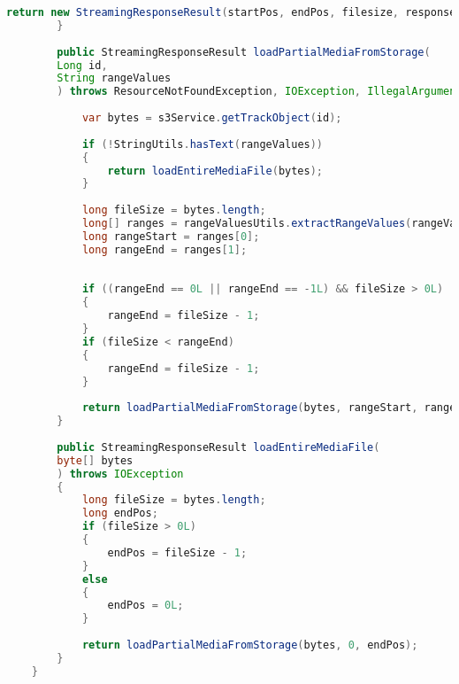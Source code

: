 \begin{lstlisting}[language=java]
			return new StreamingResponseResult(startPos, endPos, filesize, responseStream);
		}
		
		public StreamingResponseResult loadPartialMediaFromStorage(
		Long id,
		String rangeValues
		) throws ResourceNotFoundException, IOException, IllegalArgumentException {
			
			var bytes = s3Service.getTrackObject(id);
			
			if (!StringUtils.hasText(rangeValues))
			{
				return loadEntireMediaFile(bytes);
			}
			
			long fileSize = bytes.length;
			long[] ranges = rangeValuesUtils.extractRangeValues(rangeValues);
			long rangeStart = ranges[0];
			long rangeEnd = ranges[1];
			
			
			if ((rangeEnd == 0L || rangeEnd == -1L) && fileSize > 0L)
			{
				rangeEnd = fileSize - 1;
			}
			if (fileSize < rangeEnd)
			{
				rangeEnd = fileSize - 1;
			}
			
			return loadPartialMediaFromStorage(bytes, rangeStart, rangeEnd);
		}
		
		public StreamingResponseResult loadEntireMediaFile(
		byte[] bytes
		) throws IOException
		{
			long fileSize = bytes.length;
			long endPos;
			if (fileSize > 0L)
			{
				endPos = fileSize - 1;
			}
			else
			{
				endPos = 0L;
			}
			
			return loadPartialMediaFromStorage(bytes, 0, endPos);
		}
	}
\end{lstlisting}

